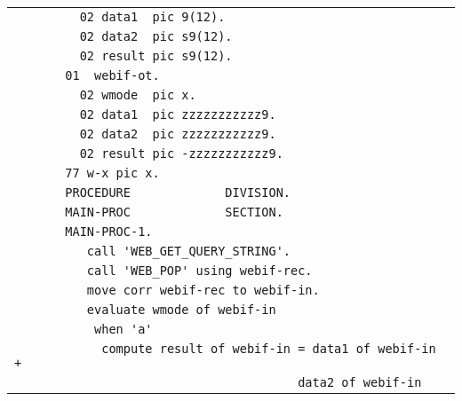 {\begin{tabular}{|l|}
\vspace{-0.4em}\verb!         02 data1  pic 9(12).!\\
\vspace{-0.4em}\verb!         02 data2  pic s9(12).!\\
\vspace{-0.4em}\verb!         02 result pic s9(12).!\\
\vspace{-0.4em}\verb!       01  webif-ot.!\\
\vspace{-0.4em}\verb!         02 wmode  pic x.!\\
\vspace{-0.4em}\verb!         02 data1  pic zzzzzzzzzzz9.!\\
\vspace{-0.4em}\verb!         02 data2  pic zzzzzzzzzzz9.!\\
\vspace{-0.4em}\verb!         02 result pic -zzzzzzzzzzz9.!\\
\vspace{-0.4em}\verb!       77 w-x pic x.!\\
\vspace{-0.4em}\verb!       PROCEDURE             DIVISION.!\\
\vspace{-0.4em}\verb!       MAIN-PROC             SECTION.!\\
\vspace{-0.4em}\verb!       MAIN-PROC-1.!\\
\vspace{-0.4em}\verb!          call 'WEB_GET_QUERY_STRING'.!\\
\vspace{-0.4em}\verb!          call 'WEB_POP' using webif-rec.!\\
\vspace{-0.4em}\verb!          move corr webif-rec to webif-in.!\\
\vspace{-0.4em}\verb!          evaluate wmode of webif-in!\\
\vspace{-0.4em}\verb!           when 'a'!\\
\vspace{-0.4em}\verb!            compute result of webif-in = data1 of webif-in +!\\
\vspace{-0.4em}\verb!                                       data2 of webif-in!\\

\end{tabular}}
